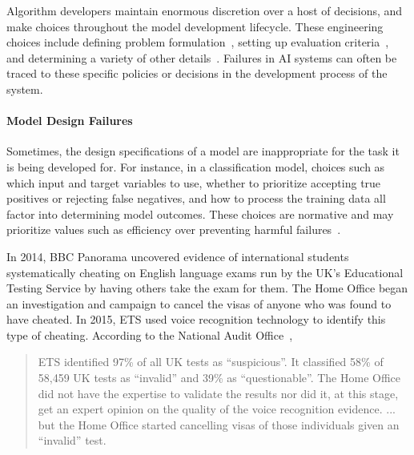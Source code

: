\documentclass[acmconf,manuscript,screen,natbib=true]{acmart}
\begin{document}
Algorithm developers maintain enormous discretion over a host of decisions, and make choices throughout the model development lifecycle. These engineering choices include defining problem formulation~\cite{Passi2019-av}, setting up evaluation criteria~\cite{Passi2020-dr,LiaoAreWe2021}, and determining a variety of other details~\cite{Passi2018-jt,Muller2019-cy}. Failures in AI systems can often be traced to these specific policies or decisions in the development process of the system.


\paragraph{Model Design Failures}

Sometimes, the design specifications of a model are inappropriate for the task it is being developed for. 
For instance, in a classification model, choices such as which input and target variables to use, whether to prioritize accepting true positives or rejecting false negatives, and how to process the training data all factor into determining model outcomes. These choices are normative and may prioritize values such as efficiency over preventing harmful failures~\cite{Lehr_undated-aq, Dobbe2019-ms}.

In 2014, BBC Panorama uncovered evidence of international students systematically cheating on English language exams run by the UK's Educational Testing Service by having others take the exam for them. The Home Office began an investigation and campaign to cancel the visas of anyone who was found to have cheated. In 2015, ETS used voice recognition technology to identify this type of cheating. According to the National Audit Office~\cite{nao_ets},

\blockquote{ETS identified 97\% of all UK tests as “suspicious”. It classified 58\% of 58,459 UK tests as “invalid” and 39\% as “questionable”. The Home Office did not have the expertise to validate the results nor did it, at this stage, get an expert opinion on the quality of the voice recognition evidence. ... but the Home Office started cancelling visas of those individuals given an “invalid” test.}
\end{document}
